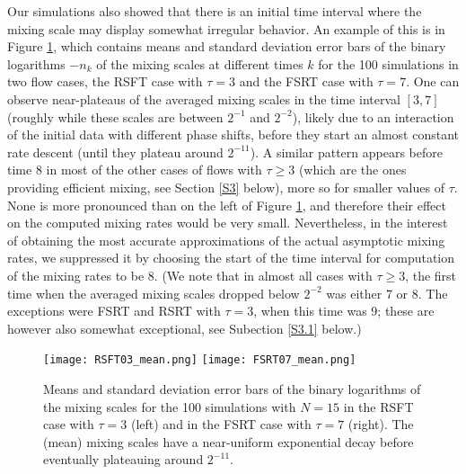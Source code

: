 \documentclass[12pt]{article}
\numberwithin{figure}{section}
\numberwithin{equation}{section}
\begin{document}
Our simulations also showed that there is an initial time interval where the mixing scale may display somewhat irregular behavior.  An example of this is  in Figure \ref{plot_example}, which contains means and standard deviation error bars of the binary logarithms $-n_k$ of the mixing scales at different times $k$  for the 100 simulations  in two flow cases, the RSFT case with $\tau=3$ and the FSRT case with $\tau=7$.  One can observe near-plateaus of the averaged mixing scales in the time interval $[3,7]$ (roughly while these scales are between $2^{-1}$ and $2^{-2}$), likely due to an interaction of the initial data with different phase shifts, before they start an almost constant rate descent (until they plateau around $2^{-11}$).  A similar pattern appears before time $8$ in most of the other cases of flows with $\tau\ge 3$ (which are the ones providing efficient mixing, see Section \ref{S3} below), more so for smaller values of $\tau$.  None is more pronounced than on the left of Figure \ref{plot_example}, and therefore their effect on the computed mixing rates would be very small.  Nevertheless, in the interest of obtaining the most accurate approximations of the actual asymptotic mixing rates, we suppressed it by choosing the start of the time interval for computation of the mixing rates to be 8.  (We note that in almost all cases with $\tau\ge 3$, the first time when the averaged mixing scales dropped below $2^{-2}$ was either 7 or 8.  The exceptions were FSRT and RSRT with $\tau=3$, when this time was 9; these are however also somewhat exceptional, see Subection \ref{S3.1} below.)


\begin{figure}[htbp]
    \centering
        \texttt{[image: RSFT03\_mean.png]} %
        \texttt{[image: FSRT07\_mean.png]}        
    \caption{Means and standard deviation error bars of the binary logarithms of the mixing scales for the 100 simulations 
   with $N = 15$ in the RSFT case with $\tau=3$ (left) and  in the FSRT case with $\tau=7$ (right).  The (mean) mixing scales have a near-uniform exponential decay before eventually plateauing around $2^{-11}$.}
    \label{plot_example}
\end{figure}
\end{document}
